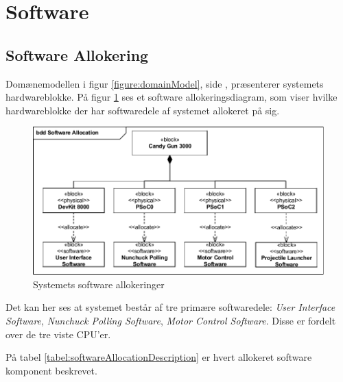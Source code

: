 \section{Software}

\subsection{Software Allokering}
\label{afsnit:SoftwareAllokering}

Domænemodellen i figur \ref{figure:domainModel}, side \pageref{figure:domainModel}, præsenterer systemets hardwareblokke. På figur \ref{figure:allocationDiagram} ses et software allokeringsdiagram, som viser hvilke hardwareblokke der har softwaredele af systemet allokeret på sig. 

\begin{figure}[H]
	\centering
	\includegraphics[width=\textwidth]{SystemArkitektur/images/SoftwareAllocation}
	\caption{Systemets software allokeringer}
	\label{figure:allocationDiagram}
\end{figure}

Det kan her ses at systemet består af tre primære softwaredele: \textit{User Interface Software}, \textit{Nunchuck Polling Software}, \textit{Motor Control Software}. Disse er fordelt over de tre viste CPU'er.

På tabel \ref{tabel:softwareAllocationDescription} er hvert allokeret software komponent beskrevet.

